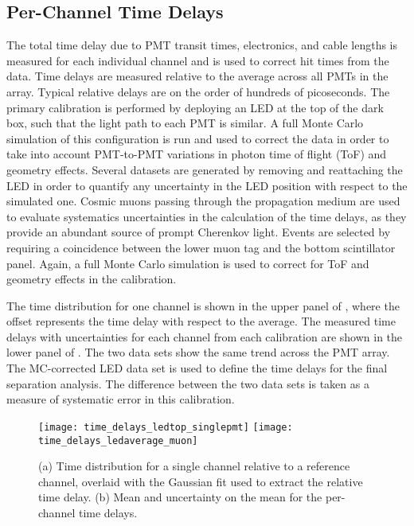 \subsection{Per-Channel Time Delays}\label{s:delay}

The total time delay due to PMT transit times, electronics, and cable lengths is measured for each individual channel and is used to correct hit times from the data. 
Time delays are measured relative to the average across all PMTs in the array. 
Typical relative delays are on the order of hundreds of picoseconds. 
The primary calibration is performed by deploying an LED at the top of the dark box, such that the light path to each PMT is similar.  A full Monte Carlo simulation of this configuration is run and used to correct the data in order to take into account PMT-to-PMT variations in photon time of flight (ToF) and geometry effects.  
Several datasets are generated by removing and reattaching the LED in order to quantify any uncertainty in the LED position with respect to the simulated one. 
Cosmic muons passing through the propagation medium are used to evaluate systematics uncertainties in the calculation of the time delays, as they provide an abundant source of prompt Cherenkov light. 
Events are selected  by requiring a coincidence between the lower muon tag and the bottom scintillator panel. 
Again, a full Monte Carlo simulation is used to correct for ToF and geometry effects in the calibration.  

The time distribution for one channel is shown in the upper panel of , where the offset represents the time delay with respect to the average. 
The measured time delays with uncertainties for each channel from each calibration are shown in the lower panel of .  
The two data sets show the same trend across the PMT array.  
The MC-corrected LED data set is used to define the time delays for the final separation analysis.
The difference between the two data sets is taken as a measure of  systematic error in this calibration.  

\begin{figure}
	\centering
	\texttt{[image: time\_delays\_ledtop\_singlepmt]}
	\texttt{[image: time\_delays\_ledaverage\_muon]}
	\caption{(a) Time distribution for a single channel relative to a reference channel, overlaid with the Gaussian fit used to extract the relative time delay.  (b) Mean and uncertainty on the mean for the per-channel time delays.}
	\label{fig:time_delay}
\end{figure}


